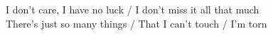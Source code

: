 I don't care, I have no luck / I don't miss it all that much \\
There's just so many things / That I can't touch / I'm torn \\

